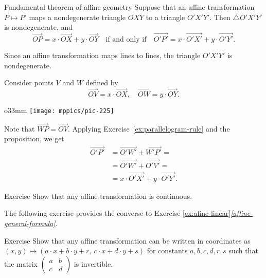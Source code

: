 \begin{thm}{Fundamental theorem of affine geometry}\label{thm:fundamental-theorem-of-affine-geometry}
Suppose that an affine transformation $P\mapsto P'$ maps a nondegenerate triangle $OXY$ to a triangle $O'X'Y'$.
Then $\triangle O'X'Y'$ is nondegenerate, and
\[\overrightarrow{OP}=x\cdot\overrightarrow{OX}+y\cdot\overrightarrow{OY}\quad\text{if and only if}\quad\overrightarrow{O'P'}=x\cdot\overrightarrow{O'X'}+y\cdot\overrightarrow{O'Y'}.\]
\end{thm}

Since an affine transformation maps lines to lines, the triangle
$O'X'Y'$ is nondegenerate.

Consider points $V$ and $W$ defined by
\[\overrightarrow{OV}=x\cdot\overrightarrow{OX},
\quad
\overrightarrow{OW}=y\cdot\overrightarrow{OY}.
\]

{

\begin{wrapfigure}{o}{33mm}
\centering
\vskip-0mm
\texttt{[image: mppics/pic-225]}
\end{wrapfigure}

Note that 
$\overrightarrow{WP}=\overrightarrow{OV}$.
Applying Exercise~\ref{ex:parallelogram-rule} and the proposition, we get
\begin{align*}\overrightarrow{O'P'}&=\overrightarrow{O'W'}+\overrightarrow{W'P'}=
\\
&=\overrightarrow{O'W'}+\overrightarrow{O'V'}=
\\
&=x\cdot\overrightarrow{O'X'}+y\cdot\overrightarrow{O'Y'}.
\end{align*}
\qedsf

}

\begin{thm}{Exercise}\label{ex:affine-continuous}
Show that any affine transformation is continuous.
\end{thm}

The following exercise provides the converse to Exercise \ref{ex:afine-linear}\textit{\ref{affine-general-formula}}.

\begin{thm}{Exercise}\label{ex:affine-coordinates}
Show that any affine transformation can be written in coordinates as 
$(x,y)\mapsto(a\cdot x+b\cdot y+r,\ c\cdot x+d\cdot y+s)$
for constants $a,b,c,d,r,s$ such that the matrix $(\begin{smallmatrix}a&b\\c&d\end{smallmatrix})$ is invertible. 
\end{thm}

